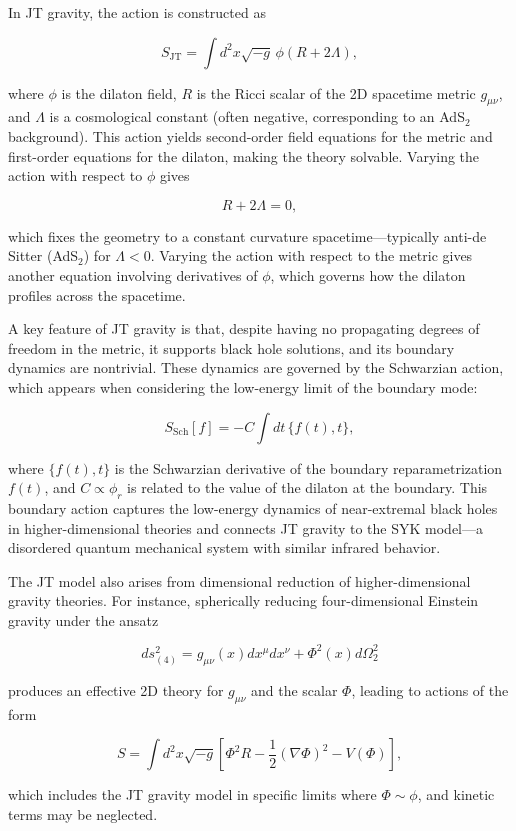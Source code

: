 In JT gravity, the action is constructed as

$$
S_{\text{JT}} = \int d^2x \sqrt{-g} \, \phi (R + 2\Lambda),
$$

where $\phi$ is the dilaton field, $R$ is the Ricci scalar of the 2D spacetime metric $g_{\mu\nu}$, and $\Lambda$ is a cosmological constant (often negative, corresponding to an AdS$_2$ background). This action yields second-order field equations for the metric and first-order equations for the dilaton, making the theory solvable. Varying the action with respect to $\phi$ gives

$$
R + 2\Lambda = 0,
$$

which fixes the geometry to a constant curvature spacetime—typically anti-de Sitter (AdS$_2$) for $\Lambda < 0$. Varying the action with respect to the metric gives another equation involving derivatives of $\phi$, which governs how the dilaton profiles across the spacetime.

A key feature of JT gravity is that, despite having no propagating degrees of freedom in the metric, it supports black hole solutions, and its boundary dynamics are nontrivial. These dynamics are governed by the Schwarzian action, which appears when considering the low-energy limit of the boundary mode:

$$
S_{\text{Sch}}[f] = -C \int dt \, \{ f(t), t \},
$$

where $\{f(t), t\}$ is the Schwarzian derivative of the boundary reparametrization $f(t)$, and $C \propto \phi_r$ is related to the value of the dilaton at the boundary. This boundary action captures the low-energy dynamics of near-extremal black holes in higher-dimensional theories and connects JT gravity to the SYK model—a disordered quantum mechanical system with similar infrared behavior.

The JT model also arises from dimensional reduction of higher-dimensional gravity theories. For instance, spherically reducing four-dimensional Einstein gravity under the ansatz

$$
ds^2_{(4)} = g_{\mu\nu}(x) dx^\mu dx^\nu + \Phi^2(x) d\Omega_2^2
$$

produces an effective 2D theory for $g_{\mu\nu}$ and the scalar $\Phi$, leading to actions of the form

$$
S = \int d^2x \sqrt{-g} \left[ \Phi^2 R - \frac{1}{2} (\nabla \Phi)^2 - V(\Phi) \right],
$$

which includes the JT gravity model in specific limits where $\Phi \sim \phi$, and kinetic terms may be neglected.

